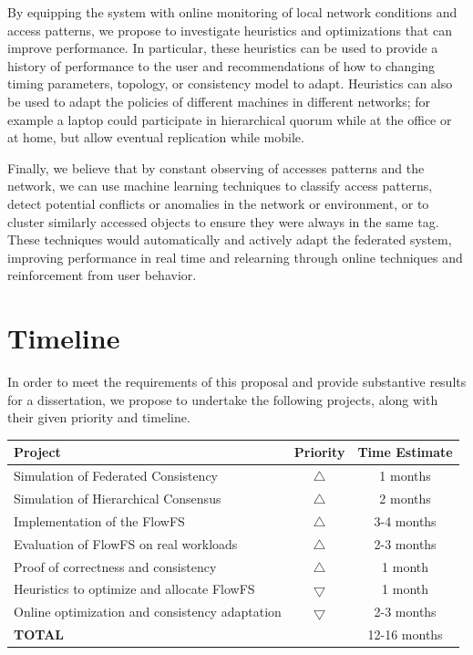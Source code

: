 \documentclass{article}
\begin{document}
By equipping the system with online monitoring of local network conditions and access patterns, we propose to investigate heuristics and optimizations that can improve performance. In particular, these heuristics can be used to provide a history of performance to the user and recommendations of how to changing timing parameters, topology, or consistency model to adapt. Heuristics can also be used to adapt the policies of different machines in different networks; for example a laptop could participate in hierarchical quorum while at the office or at home, but allow eventual replication while mobile.

Finally, we believe that by constant observing of accesses patterns and the network, we can use machine learning techniques to classify access patterns, detect potential conflicts or anomalies in the network or environment, or to cluster similarly accessed objects to ensure they were always in the same tag. These techniques would automatically and actively adapt the federated system, improving performance in real time and relearning through online techniques and reinforcement from user behavior.

\section{Timeline}
\label{sec:timeline}

In order to meet the requirements of this proposal and provide substantive results for a dissertation, we propose to undertake the following projects, along with their given priority and timeline.

\begin{center}
\begin{tabular}{|l c|c|}
\hline
Project & Priority & Time Estimate \\
\hline
Simulation of Federated Consistency & $\bigtriangleup$ & 1 months \\
Simulation of Hierarchical Consensus & $\bigtriangleup$ & 2 months \\
Implementation of the FlowFS & $\bigtriangleup$ & 3-4 months \\
Evaluation of FlowFS on real workloads & $\bigtriangleup$ & 2-3 months \\
Proof of correctness and consistency & $\bigtriangleup$ & 1 month \\
Heuristics to optimize and allocate FlowFS & $\bigtriangledown$ & 1 month \\
Online optimization and consistency adaptation & $\bigtriangledown$ & 2-3 months \\
\hline
\multicolumn{2}{|l|}{\textbf{TOTAL}} & 12-16 months \\
\hline
\end{tabular}
\end{center}
\end{document}

